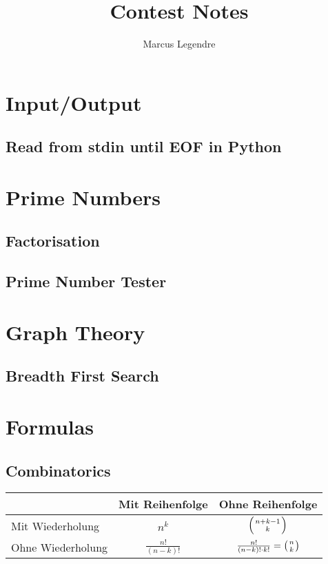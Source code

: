 \documentclass[]{article}
\title{Contest Notes}
\author{Marcus Legendre}
\date{}
\begin{document}
\maketitle

\tableofcontents


\section{Input/Output}

\subsection{Read from stdin until EOF in Python}



\section{Prime Numbers}

\subsection{Factorisation}


\subsection{Prime Number Tester}



\section{Graph Theory}

\subsection{Breadth First Search}



\section{Formulas}

\subsection{Combinatorics}
\begin{tabular}{ | l | c | c |}
  \hline
   & Mit Reihenfolge & Ohne Reihenfolge \\ \hline
   Mit Wiederholung & $n^k$ & $\left( {n+k-1} \atop k \right)$  \\ \hline
   Ohne Wiederholung & $\frac{n!}{\left( n-k \right) !}$ & $\frac{n!}{\left( n-k \right) !\cdot k!} = \left( n \atop k \right)$  \\ \hline
\end{tabular}
\end{document}
